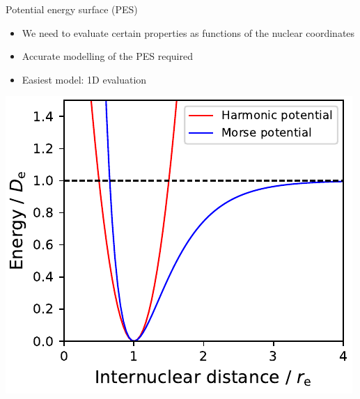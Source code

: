 \documentclass[t]{beamer}
\begin{document}
	\begin{frame}{Potential energy surface (PES)}
	    \begin{minipage}[b]{0.35\textwidth}
	        \begin{itemize}
	            \item We need to evaluate certain properties as functions of the nuclear coordinates
	            \item Accurate modelling of the PES required
	            \item Easiest model: 1D evaluation
	        \end{itemize}
	        \vspace{2.2cm}
	    \end{minipage}
	    \begin{minipage}[t]{0.6\textwidth}
	        \includegraphics[width=\textwidth]{figures/potential.pdf}
	    \end{minipage}
	\end{frame}
\end{document}
